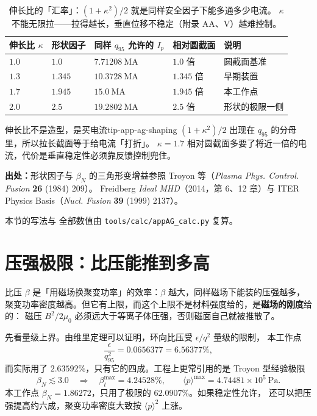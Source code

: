 \begin{table}[htbp]
\centering
\small
\caption{伸长比的「汇率」：$(1+\kappa^2)/2$ 就是同样安全因子下能多通多少电流。
$\kappa$ 不能无限拉——拉得越长，垂直位移不稳定（附录 AA、V）越难控制。}
\label{tab:app-ag-shaping}
\begin{tabular}{p{2.4cm}p{2.6cm}p{3.4cm}p{3.6cm}p{2.6cm}}
\toprule
伸长比 $\kappa$ & 形状因子 & 同样 $q_{95}$ 允许的 $I_p$ & 相对圆截面 & 说明 \\
\midrule
$1.0$ & $1.0$ & $7.71208\ \mathrm{MA}$ & $1.0$ 倍 & 圆截面基准 \\
$1.3$ & $1.345$ & $10.3728\ \mathrm{MA}$ & $1.345$ 倍 & 早期装置 \\
$1.7$ & $1.945$ & $15.0\ \mathrm{MA}$ & $1.945$ 倍 & 本工作点 \\
$2.0$ & $2.5$ & $19.2802\ \mathrm{MA}$ & $2.5$ 倍 & 形状的极限一侧 \\
\bottomrule
\end{tabular}

\end{table}

\begin{tip}{伸长比不是造型，是买电流}{tip-app-ag-shaping}
$(1+\kappa^2)/2$ 出现在 $q_{95}$ 的分母里，所以拉长截面等于给电流「打折」。
$\kappa=1.7$ 相对圆截面多要了将近一倍的电流，代价是垂直稳定性必须靠反馈控制兜住。
\end{tip}

{\footnotesize
\textbf{出处：}形状因子与 $\beta_N$ 的三角形变增益参照 Troyon 等（\emph{Plasma Phys. Control. Fusion} \textbf{26} (1984) 209）。
Freidberg \emph{Ideal MHD}（2014，第 6、12 章）与 ITER Physics Basis（\emph{Nucl. Fusion} \textbf{39} (1999) 2137）。

本节的写法与
全部数值由 \texttt{tools/\allowbreak{}calc/\allowbreak{}appAG\_calc.py} 复算。
}

\section{压强极限：比压能推到多高}
\label{sec:app-ag-beta}

比压 $\beta$ 是「用磁场换聚变功率」的效率：$\beta$ 越大，同样磁场下能装的压强越多，
聚变功率密度越高。但它有上限，而这个上限不是材料强度给的，是\textbf{磁场的刚度}给的：
磁压 $B^2/2\mu_0$ 必须远大于等离子体压强，否则磁面自己就被推散了。

先看量级上界。由维里定理可以证明，环向比压受 $\epsilon/q^2$ 量级的限制，
本工作点
\begin{equation}
\frac{\epsilon}{q_{95}^2} = 0.0656377 = 6.56377\%,
\label{eq:app-ag-virial}
\end{equation}
而实际用了 $2.63592\%$，只有它的四成。工程上更常引用的是 Troyon 型经验极限
\begin{equation}
\beta_N \lesssim 3.0
\quad\Longrightarrow\quad
\beta_t^{\max} = 4.24528\%,
\qquad
\langle p\rangle^{\max} = 4.74481\times10^{5}\ \mathrm{Pa}.
\label{eq:app-ag-troyon}
\end{equation}
本工作点 $\beta_N=1.86272$，只用了极限的 $62.0907\%$。如果稳定性允许，
还可以把压强提高约六成，聚变功率密度大致按 $\langle p\rangle^2$ 上涨。

